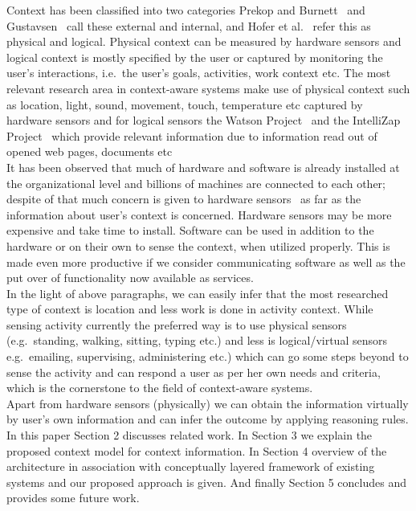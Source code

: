 \documentclass[copyright,creativecommons,noderivs,noncommercial]{eptcs}
\begin{document}
Context has been classified into two categories Prekop and Burnett~\cite{k22} and Gustavsen~\cite{k13} call these external and internal, and Hofer et al.~\cite{k16} refer this as physical and logical. Physical context can be measured by hardware sensors and logical context  is mostly specified by the user or captured by monitoring the user's interactions, i.e.~the user's goals, activities, work context etc. The most relevant research area in context-aware systems make use of physical context such as location, light, sound, movement, touch, temperature etc captured by hardware sensors and for logical sensors  the Watson Project~\cite{k6} and the IntelliZap Project~\cite{k10} which provide relevant information due to information read out of opened web pages, documents etc~\cite{k3}\\
It has been observed that much of hardware and software is already installed at the organizational level and billions of machines are connected to each other; despite of that much concern is given to hardware sensors~\cite{k7} as far as the information about user's context is concerned. Hardware sensors may be more expensive and take time to install. Software can be used in addition to the hardware or on their own to sense the context, when utilized properly. This is made even more productive if we consider communicating software as well as the put over of functionality now available as services.\\
In the light of above paragraphs, we can easily infer that the most researched type of context is location and less work is done in activity context. While sensing activity currently the preferred way is to use physical sensors (e.g.~standing, walking, sitting, typing etc.) and less is logical/virtual sensors e.g.~emailing, supervising, administering etc.) which can go some steps beyond to sense the activity and can respond a user as per her own needs and criteria, which is the cornerstone to the field of context-aware systems.\\
Apart from hardware sensors (physically) we can obtain the information virtually by user's own information and can infer the outcome by applying reasoning rules.\\
In this paper Section 2 discusses related work. In Section 3 we explain the proposed context model for context information. In Section 4 overview of the architecture in association with conceptually layered framework of existing systems and our proposed approach is given. And finally Section 5 concludes and provides some future work.
\end{document}

